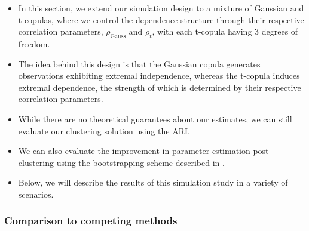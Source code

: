 \documentclass{article}
\numberwithin{equation}{section}
\begin{document}
\begin{itemize}
  \item In this section, we extend our simulation design to a mixture of Gaussian and t-copulas, where we control the dependence structure through their respective correlation parameters, $\rho_{\text{Gauss}}$ and $\rho_{t}$, with each t-copula having 3 degrees of freedom.
  \item The idea behind this design is that the Gaussian copula generates observations exhibiting extremal independence, whereas the t-copula induces extremal dependence, the strength of which is determined by their respective correlation parameters.
  \item While there are no theoretical guarantees about our estimates, we can still evaluate our clustering solution using the ARI.
  \item We can also evaluate the improvement in parameter estimation post-clustering using the bootstrapping scheme described in \cite{Heffernan2004}.
  \item Below, we will describe the results of this simulation study in a variety of scenarios.
\end{itemize}

\subsubsection{Comparison to competing methods} \label{subsubsec:sim_competing_methods}


\end{document}
